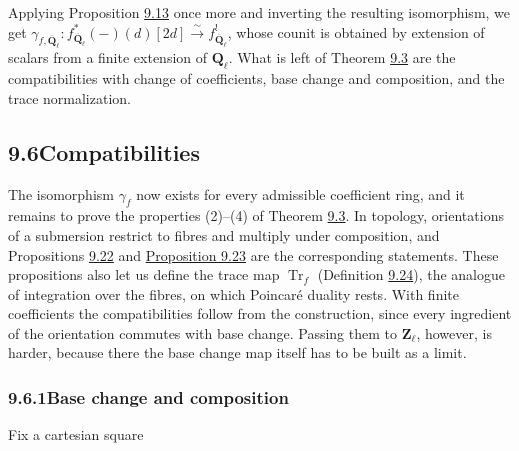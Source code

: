 \documentclass[11pt]{article}
\begin{document}
\label{bp73}%
Applying Proposition \hyperref[bp43]{9.13} once more and inverting the resulting isomorphism, we get \(\gamma_{f,\overline{\mathbf Q}_\ell}:f_{\overline{\mathbf Q}_\ell}^*(-)(d)[2d]\xrightarrow{\sim}f^!_{\overline{\mathbf Q}_\ell}\), whose counit is obtained by extension of scalars from a finite extension of \(\mathbf Q_\ell\). What is left of Theorem \hyperref[bp11]{9.3} are the compatibilities with change of coefficients, base change and composition, and the trace normalization.



\subsection*{\texorpdfstring{9.6\quad Compatibilities}{9.6 Compatibilities}}
\label{bp74}%
\label{bp75}%
The isomorphism \(\gamma_f\) now exists for every admissible coefficient ring, and it remains to prove the properties (2)–(4) of Theorem \hyperref[bp11]{9.3}. In topology, orientations of a submersion restrict to fibres and multiply under composition, and Propositions \hyperref[bp78]{9.22} and \hyperref[bp81]{Proposition 9.23} are the corresponding statements. These propositions also let us define the trace map \(\operatorname{Tr}_f\) (Definition \hyperref[bp85]{9.24}), the analogue of integration over the fibres, on which Poincaré duality rests. With finite coefficients the compatibilities follow from the construction, since every ingredient of the orientation commutes with base change. Passing them to \(\mathbf Z_\ell\), however, is harder, because there the base change map itself has to be built as a limit.

\subsubsection*{\texorpdfstring{9.6.1\quad Base change and composition}{9.6.1 Base change and composition}}
\label{bp76}%
\label{bp77}%
Fix a cartesian square
\end{document}
